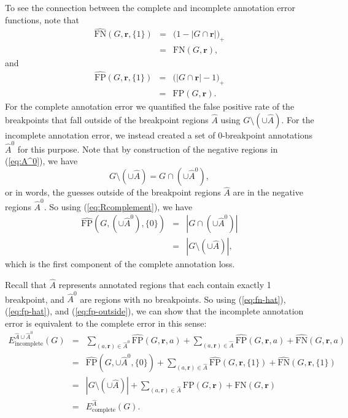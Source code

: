 \documentclass{jsfds} %
\renewcommand{\r}{ \mathbf{ r} }
\begin{document}
To see the connection between the complete and incomplete annotation
error functions, note that
\begin{eqnarray}
\nonumber  \hat{\text{FN}}(G,\r,\{1\}) 
&=&   \big(
1-|G\cap\r|
\big)_+\\
&=&
\text{FN}(G,\r), \label{eq:fn-hat}
\end{eqnarray}
and
\begin{eqnarray}
\nonumber
  \hat{\text{FP}}(G,\r,\{1\}) 
&=&
\big( 
|G\cap\r|-1
\big)_+\\
&=& \text{FP}(G,\r). \label{eq:fp-hat}
\end{eqnarray}
For the complete annotation error we quantified the false positive
rate of the breakpoints that fall outside of the breakpoint regions
$\hat A$ using $G\setminus(\cup \hat A)$. For the incomplete
annotation error, we instead created a set of 0-breakpoint annotations
$\hat A^0$ for this purpose. Note that by construction of the negative
regions in (\ref{eq:A^0}), we have 
\begin{equation}
  \label{eq:Rcomplement}
  G\setminus \left(\cup \hat A\right)
 = 
G\cap\left(\cup \hat A^0 \right),
\end{equation}
or in words, the guesses outside of the breakpoint regions $\hat A$
are in the negative regions $\hat A^0$. So using
(\ref{eq:Rcomplement}), we have
\begin{eqnarray}
  \hat{\text{FP}}(G,(\cup \hat A^0),\{0\})
&=& 
|G\cap(
  \cup \hat A^0
)|\nonumber
\\
&=&
|G\setminus(\cup\hat A)|,\label{eq:fp-outside}
\end{eqnarray}
which is the first component of the complete annotation loss.



Recall that $\hat A$ represents annotated regions that each contain
exactly 1 breakpoint, and $\hat A^0$ are regions with no breakpoints. So
using (\ref{eq:fn-hat}), (\ref{eq:fp-hat}), and
(\ref{eq:fp-outside}), we can show that the incomplete annotation error
is equivalent to the complete error in this sense:
\begin{eqnarray}
  E_{\text{incomplete}}^{\hat A\cup \hat A^0}(G)
&=&
\sum_{(a, \r)\in \hat A^0} \hat{\text{FP}}(G,\r,a)\nonumber 
+
\sum_{(a, \r)\in\hat A} \hat{\text{FP}}(G,\r,a) + \hat{\text{FN}}(G,\r,a)
 \\
&=&
 \hat{\text{FP}}(G,\cup \hat A^0,\{0\})\nonumber 
+
\sum_{(a, \r)\in\hat A} \hat{\text{FP}}(G,\r,\{1\}) + \hat{\text{FN}}(G,\r,\{1\})
 \\
&=&
|G\setminus(\cup\hat A)|
+\nonumber
\sum_{(a, \r)\in\hat A} {\text{FP}}(G,\r) + {\text{FN}}(G,\r)\\
&=&
E^{\hat A}_{\text{complete}}(G).
\end{eqnarray}
\end{document}
